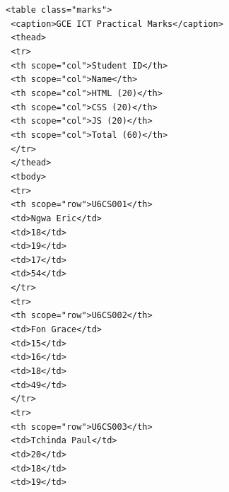 \documentclass[11pt]{article}
\begin{document}
\begin{corrige}[Exercise 4]
\texttt{<table class="marks">}\\
\texttt{  <caption>GCE ICT Practical Marks</caption>}\\
\texttt{  <thead>}\\
\texttt{    <tr>}\\
\texttt{      <th scope="col">Student ID</th>}\\
\texttt{      <th scope="col">Name</th>}\\
\texttt{      <th scope="col">HTML (20)</th>}\\
\texttt{      <th scope="col">CSS (20)</th>}\\
\texttt{      <th scope="col">JS (20)</th>}\\
\texttt{      <th scope="col">Total (60)</th>}\\
\texttt{    </tr>}\\
\texttt{  </thead>}\\
\texttt{  <tbody>}\\
\texttt{    <tr>}\\
\texttt{      <th scope="row">U6CS001</th>}\\
\texttt{      <td>Ngwa Eric</td>}\\
\texttt{      <td>18</td>}\\
\texttt{      <td>19</td>}\\
\texttt{      <td>17</td>}\\
\texttt{      <td>54</td>}\\
\texttt{    </tr>}\\
\texttt{    <tr>}\\
\texttt{      <th scope="row">U6CS002</th>}\\
\texttt{      <td>Fon Grace</td>}\\
\texttt{      <td>15</td>}\\
\texttt{      <td>16</td>}\\
\texttt{      <td>18</td>}\\
\texttt{      <td>49</td>}\\
\texttt{    </tr>}\\
\texttt{    <tr>}\\
\texttt{      <th scope="row">U6CS003</th>}\\
\texttt{      <td>Tchinda Paul</td>}\\
\texttt{      <td>20</td>}\\
\texttt{      <td>18</td>}\\
\texttt{      <td>19</td>}\\

\end{corrige}
\end{document}
